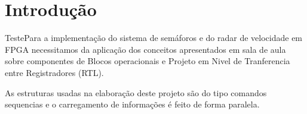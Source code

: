 \section{Introdução}
\setlength{\parindent}{2cm}

TestePara a implementação do sistema de semáforos e do radar de velocidade em FPGA necessitamos da aplicação dos conceitos apresentados em sala de aula sobre componentes de Blocos operacionais e Projeto em Nivel de Tranferencia entre Registradores (RTL).

As estruturas usadas na elaboração deste projeto são do tipo comandos sequencias e o carregamento de informações é feito de forma paralela.
